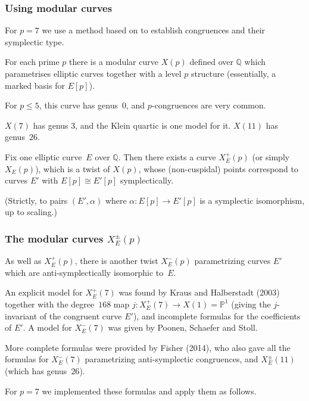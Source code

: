 \documentclass[compress]{beamer}
\newcommand{\Q}{\mathbb Q}
\newcommand{\PP}{\mathbb P}
\newcommand{\high}[1]{\emph{\color{blue}{#1}}}
\begin{document}
\begin{frame}\frametitle{Using modular curves}

  For $p=7$ we use a method based on \high{modular curves} to
  establish congruences and their symplectic type.    \pause

 For each prime $p$ there is a modular curve $X(p)$ defined over $\Q$
 which parametrises elliptic curves together with a level $p$ structure
 (essentially, a marked basis for $E[p]$).    \pause

 For $p\le5$, this curve has genus~$0$, and $p$-congruences are very
 common.

 $X(7)$ has genus $3$, and the Klein quartic is one model for it.
 $X(11)$ has genus~$26$.

    \pause
  \medskip
  Fix one elliptic curve~$E$ over $\Q$.  Then there exists a curve
  $X_E^+(p)$ (or simply $X_E(p)$), which is a twist of $X(p)$, whose
  (non-cuspidal) points correspond to curves $E'$ with $E[p]\cong
  E'[p]$ symplectically.

  {\small(Strictly, to pairs $(E',\alpha)$ where $\alpha:E[p]\to E'[p]$ is a
  symplectic isomorphism, up to scaling.)}
\end{frame}

\begin{frame}\frametitle{The modular curves $X_E^{\pm}(p)$}
As well as $X_E^+(p)$, there is another twist $X_E^-(p)$ parametrizing
curves $E'$ which are anti-symplectically isomorphic to~$E$.  \pause
  \medskip

An explicit model for $X_E^+(7)$ was found by Kraus and Halberstadt
(2003) together with the degree~$168$ map $j:X_E^+(7)\to X(1)=\PP^1$
(giving the $j$-invariant of the congruent curve $E'$), and incomplete
formulas for the coefficients of $E'$. A model for $X_E^-(7)$ was
given by Poonen, Schaefer and Stoll.

    \pause
  \medskip
More complete formulas were provided by Fisher (2014), who also gave
all the formulas for $X_E^-(7)$ parametrizing anti-symplectic
congruences, and $X_E^{\pm}(11)$ (which has genus~$26$).

    \pause
  \medskip
For $p=7$ we implemented these formulas and apply them as follows.
\end{frame}
\end{document}
